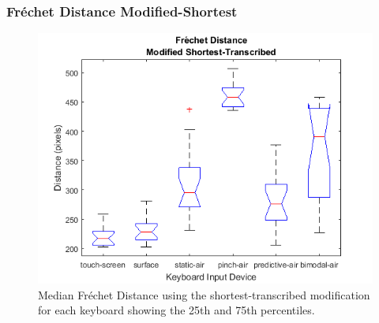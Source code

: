 \subsubsection{Fr\'echet Distance Modified-Shortest}
\begin{figure}[h]
	\centering
	\includegraphics{fig_frechet_short_boxplot}
	\caption[Fr\'echet Distance Boxplot for Modified-Shortest]{Median Fr\'echet Distance using the shortest-transcribed modification for each keyboard showing the 25th and 75th percentiles.}
	\label{fig_frechet_short_boxplot}
\end{figure}

